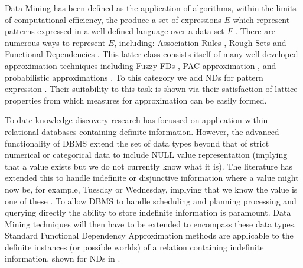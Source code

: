 Data Mining has been defined as the application of algorithms, within
the limits of computational efficiency, the produce a set of
expressions $E$ which represent patterns expressed in a well-defined
language over a data set $F$ \cite{kdd96}. There are numerous ways to
represent $E$, including: Association Rules \cite{ais93,toi96b}, Rough
Sets \cite{ziar91,incunc93} and Functional Dependencies \cite{km95}. This
latter class consists itself of many well-developed approximation
techniques including Fuzzy FDs \cite{bdp94}, PAC-approximation
\cite{at94,km95}, and probabilistic approximations
\cite{psm93,pk95,hkp98}. To this category we add NDs for pattern
expression \cite{cl98}. Their suitability to this task is shown via
their satisfaction of lattice properties from which measures for
approximation can be easily formed.

\medskip

To date knowledge discovery research has focussed on application
within relational databases containing definite information. However,
the advanced functionality of DBMS extend the set of
data types beyond that of strict numerical or categorical data to
include NULL value representation \cite{lip79,il84} (implying that a value
exists but we do not currently know what it is). The literature has
extended this to handle indefinite or disjunctive information where a
value might now be, for example, Tuesday or Wednesday, implying that
we know the value is one of these \cite{inv91,vn95}.  To allow DBMS to
handle scheduling 
and planning processing and querying directly the ability to store 
indefinite information is paramount. Data Mining techniques will then
have to be extended to encompass these data types. Standard Functional
Dependency Approximation methods are applicable to the definite
instances (or possible worlds) of a relation containing indefinite
information, shown for NDs in \cite{cl98}.

\medskip
{}

